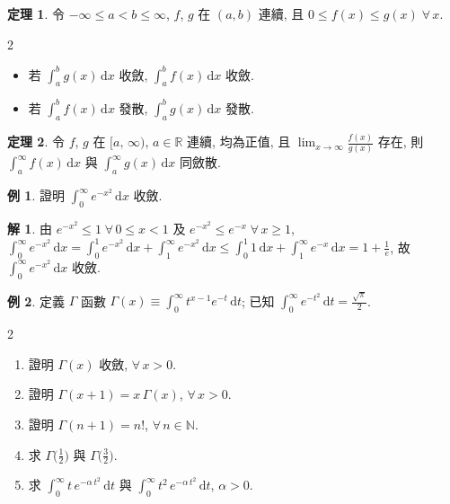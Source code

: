 \documentclass[12pt]{extarticle}
\newcommand{\ds}{\displaystyle}
\theoremstyle{definition}
\newtheorem*{thm}{定理}
\newtheorem*{ex}{例}
\newtheorem*{sol}{解}
\begin{document}
\begin{thm}
  令 $\ds -\infty\leqslant a < b \leqslant\infty$, $f$, $g$ 在 $(a, b)$ 連續, 且 $0\leqslant f(x)\leqslant g(x)\;\forall\,x$. 
  \begin{multicols}{2}
    \begin{itemize}\setlength{\itemsep}{0pt}
      \item 若 $\ds\int_a^b g(x)\,\text{d}x$ 收斂, $\ds\int_a^b f(x)\,\text{d}x$ 收斂. 
      \item 若 $\ds\int_a^b f(x)\,\text{d}x$ 發散, $\ds\int_a^b g(x)\,\text{d}x$ 發散. 
    \end{itemize}
  \end{multicols}
\end{thm}

\begin{thm}
  令 $f$, $g$ 在 $[a,\,\infty)$, $a\in\mathbb{R}$ 連續, 均為正值, 且 $\ds\lim_{x\to\infty}\frac{f(x)}{g(x)}$ 存在, 則 $\ds\int_a^\infty\!f(x)\,\text{d}x$ 與 $\ds\int_a^\infty\!g(x)\,\text{d}x$ 同斂散. 
\end{thm}

\begin{ex}
  證明 $\ds\int_0^\infty\!e^{-x^2}\,\text{d}x$ 收斂. 
\end{ex}

\begin{sol}
  由 $\ds e^{-x^2}\leqslant 1\;\forall\,0 \leqslant x < 1$ 及 $\ds e^{-x^2}\leqslant e^{-x}\;\forall\,x\geqslant 1$, $\ds\int_0^\infty\!e^{-x^2}\,\text{d}x = \int_0^1\!e^{-x^2}\,\text{d}x + \int_1^\infty\!e^{-x^2}\,\text{d}x\leqslant\int_0^1\!1\,\text{d}x + \int_1^\infty\!e^{-x}\,\text{d}x = 1 + \frac{1}{e}$, 故 $\ds\int_0^\infty\!e^{-x^2}\,\text{d}x$ 收斂. 
\end{sol}

\begin{ex}%
  定義 $\Gamma$ 函數 $\ds\Gamma(x)\equiv\int_0^\infty\!t^{x - 1}e^{-t}\,\text{d}t$; 已知 $\ds\int_0^\infty\!e^{-t^2}\,\text{d}t = \frac{\sqrt{\pi}}{2}$. 
  \setlength{\columnsep}{-2mm}
  \begin{multicols}{2}
    \begin{enumerate}\setlength{\itemsep}{0pt}
      \item 證明 $\ds\Gamma(x)$ 收斂, $\ds\forall\,x > 0$. 
      \item 證明 $\ds\Gamma(x + 1) = x\,\Gamma(x)$, $\ds\forall\,x > 0$. 
      \item 證明 $\ds\Gamma(n + 1) = n!$, $\ds\forall\,n\in\mathbb{N}$. 
      \item 求 $\ds\Gamma\Big(\frac{1}{2}\Big)$ 與 $\ds\Gamma\Big(\frac{3}{2}\Big)$. 
      \item 求 $\ds\int_0^\infty\!t\,e^{-\alpha\,t^2}\,\text{d}t$ 與 $\ds\int_0^\infty\!t^2\,e^{-\alpha\,t^2}\,\text{d}t$, $\alpha > 0$. 
    \end{enumerate}
  \end{multicols}
\end{ex}
\end{document}
